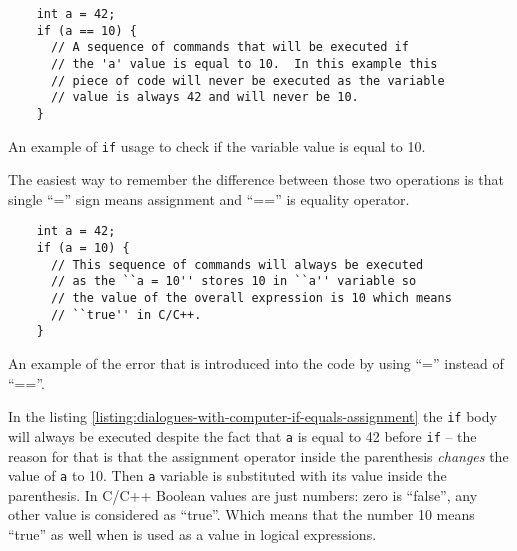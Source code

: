 \documentclass[../sparc.tex]{subfiles}
\begin{document}
\begin{listing}[ht]
  \begin{verbatim}
    int a = 42;
    if (a == 10) {
      // A sequence of commands that will be executed if
      // the 'a' value is equal to 10.  In this example this
      // piece of code will never be executed as the variable
      // value is always 42 and will never be 10.
    }
  \end{verbatim}
  \label{listing:dialogues-with-computer-if-equals}
  \caption{An example of \texttt{if} usage to check if the variable value is
    equal to 10.}
\end{listing}


The easiest way to remember the difference between those two operations is that
single ``='' sign means assignment and ``=='' is equality operator.

\begin{listing}[ht]
  \begin{verbatim}
    int a = 42;
    if (a = 10) {
      // This sequence of commands will always be executed
      // as the ``a = 10'' stores 10 in ``a'' variable so
      // the value of the overall expression is 10 which means
      // ``true'' in C/C++.
    }
  \end{verbatim}
  \label{listing:dialogues-with-computer-if-equals-assignment}
  \caption{An example of the error that is introduced into the code by using
    ``='' instead of ``==''.}
\end{listing}

In the listing \ref{listing:dialogues-with-computer-if-equals-assignment} the
\texttt{if} body will always be executed despite the fact that \texttt{a} is
equal to 42 before \texttt{if} -- the reason for that is that the assignment
operator inside the parenthesis \emph{changes} the value of \texttt{a} to 10.
Then \texttt{a} variable is substituted with its value inside the parenthesis.
In C/C++ Boolean values are just numbers: zero is ``false'', any other value is
considered as ``true''.  Which means that the number 10 means ``true'' as well
when is used as a value in logical expressions.
\end{document}

